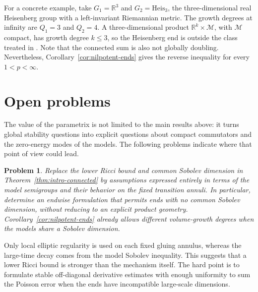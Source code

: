 \documentclass[12pt]{amsart}
\newcommand\R{\mathbb{R}}
\newtheorem{problem}[theorem]{Problem}
\theoremstyle{remark}
\begin{document}
For a concrete example, take $G_1=\R^3$ and
$G_2=\mathrm{Heis}_3$, the three-dimensional real Heisenberg group
with a left-invariant Riemannian metric.  The growth degrees at infinity
are $Q_1=3$ and $Q_2=4$.  A three-dimensional product
$\R^k\times\mathcal M$, with $\mathcal M$ compact, has growth degree
$k\leq3$, so the Heisenberg end is outside the class treated in
\cite{He26}. Note that the connected sum is also not globally doubling. Nevertheless, Corollary~\ref{cor:nilpotent-ends} gives
the reverse inequality for every $1<p<\infty$.





\section{Open problems}
\label{sec:open-problems}

The value of the parametrix is not limited to the main results above: it
turns global stability questions into explicit questions about compact
commutators and the zero-energy modes of the models.  The following
problems indicate where that point of view could lead.



\begin{problem}
\label{prob:minimal-reverse-gluing}
Replace the lower Ricci bound and common Sobolev dimension in
Theorem~\ref{thm:intro-connected} by assumptions expressed entirely in
terms of the model semigroups and their behavior on the fixed transition
annuli.  In particular, determine an endwise formulation that permits
ends with no common Sobolev dimension, without reducing to an explicit
product geometry.  Corollary~\ref{cor:nilpotent-ends} already allows
different volume-growth degrees when the models share a Sobolev dimension.
\end{problem}

Only local elliptic regularity is used on each fixed gluing annulus, whereas
the large-time decay comes from the model Sobolev inequality.  This suggests
that a lower Ricci bound is stronger than the mechanism itself.  The hard
point is to formulate stable off-diagonal derivative estimates with enough
uniformity to sum the Poisson error when the ends have incompatible
large-scale dimensions.



\end{document}
